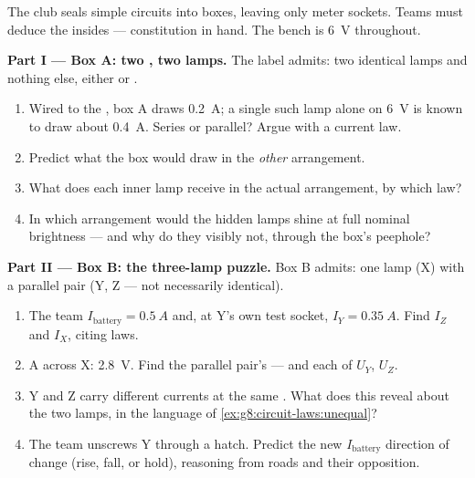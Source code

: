 \begin{problem}\label{pb:g8:circuit-laws:1}
The club seals simple circuits into boxes, leaving only meter
sockets. Teams must deduce the insides --- constitution in
hand. The bench  is \qty{6}{V} throughout.

\medskip\noindent\textbf{Part I --- Box A: two , two
lamps.}
The label admits: two identical lamps and nothing else,
either  or .
\begin{enumerate}
  \item Wired to the , box A draws \qty{0.2}{A}; a
        single such lamp alone on \qty{6}{V} is known to draw
        about \qty{0.4}{A}. Series or parallel? Argue with a
        current law.
  \item Predict what the box would draw in the \emph{other}
        arrangement.
  \item What  does each inner lamp receive in the
        actual arrangement, by which  law?
  \item In which arrangement would the hidden lamps shine at
        full nominal brightness --- and why do they visibly
        not, through the box's peephole?
\end{enumerate}

\medskip\noindent\textbf{Part II --- Box B: the three-lamp
puzzle.}
Box B admits: one lamp (X)  with a parallel pair
(Y, Z --- not necessarily identical).
\begin{enumerate}[resume]
  \item The team  $I_{\text{battery}} = \qty{0.5}{A}$
        and, at Y's own test socket, $I_Y = \qty{0.35}{A}$.
        Find $I_Z$ and $I_X$, citing laws.
  \item A  across X: \qty{2.8}{V}. Find the parallel
        pair's  --- and each of $U_Y$, $U_Z$.
  \item Y and Z carry different currents at the same .
        What does this reveal about the two lamps, in the
        language of \cref{ex:g8:circuit-laws:unequal}?
  \item The team unscrews Y through a hatch. Predict the new
        $I_{\text{battery}}$ direction of change (rise, fall,
        or hold), reasoning from roads and their opposition.
\end{enumerate}


\end{problem}
